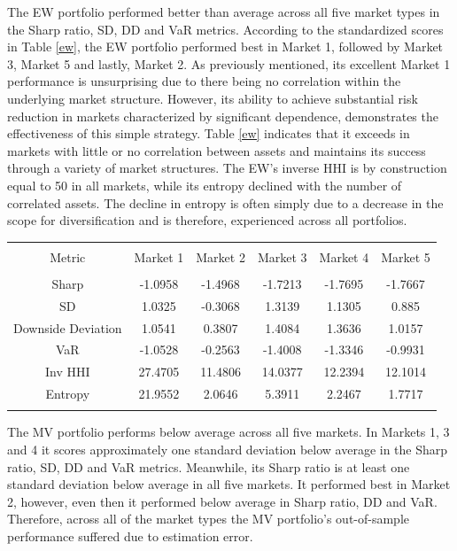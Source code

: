 \documentclass[11pt,preprint, authoryear]{elsarticle}
\let\origtable\table
\let\endorigtable\endtable
\renewenvironment{table}[1][2] {
    \expandafter\origtable\expandafter[H]
} {
    \endorigtable
}
\numberwithin{equation}{section}
\numberwithin{figure}{section}
\numberwithin{table}{section}
\begin{document}
The EW portfolio performed better than average across all five market
types in the Sharp ratio, SD, DD and VaR metrics. According to the
standardized scores in Table \ref{ew}, the EW portfolio performed best
in Market 1, followed by Market 3, Market 5 and lastly, Market 2. As
previously mentioned, its excellent Market 1 performance is unsurprising
due to there being no correlation within the underlying market
structure. However, its ability to achieve substantial risk reduction in
markets characterized by significant dependence, demonstrates the
effectiveness of this simple strategy. Table \ref{ew} indicates that it
exceeds in markets with little or no correlation between assets and
maintains its success through a variety of market structures. The EW's
inverse HHI is by construction equal to 50 in all markets, while its
entropy declined with the number of correlated assets. The decline in
entropy is often simply due to a decrease in the scope for
diversification and is therefore, experienced across all portfolios.

\begin{table}[!htbp] \centering 
  \caption{Minimum Variance} 
  \label{mv} 
\begin{tabular}{@{\extracolsep{5pt}} cccccc} 
\\[-1.8ex]\hline 
\hline \\[-1.8ex] 
Metric & Market 1 & Market 2 & Market 3 & Market 4 & Market 5 \\ 
\hline \\[-1.8ex] 
Sharp & -1.0958 & -1.4968 & -1.7213 & -1.7695 & -1.7667 \\ 
SD & 1.0325 & -0.3068 & 1.3139 & 1.1305 & 0.885 \\ 
Downside Deviation & 1.0541 & 0.3807 & 1.4084 & 1.3636 & 1.0157 \\ 
VaR & -1.0528 & -0.2563 & -1.4008 & -1.3346 & -0.9931 \\ 
Inv HHI & 27.4705 & 11.4806 & 14.0377 & 12.2394 & 12.1014 \\ 
Entropy & 21.9552 & 2.0646 & 5.3911 & 2.2467 & 1.7717 \\ 
\hline \\[-1.8ex] 
\end{tabular} 
\end{table}

The MV portfolio performs below average across all five markets. In
Markets 1, 3 and 4 it scores approximately one standard deviation below
average in the Sharp ratio, SD, DD and VaR metrics. Meanwhile, its Sharp
ratio is at least one standard deviation below average in all five
markets. It performed best in Market 2, however, even then it performed
below average in Sharp ratio, DD and VaR. Therefore, across all of the
market types the MV portfolio's out-of-sample performance suffered due
to estimation error.
\end{document}
